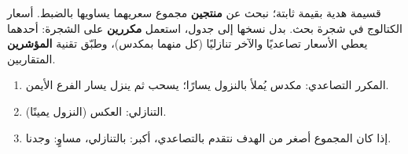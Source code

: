 \begin{statement}
قسيمة هدية بقيمة ثابتة؛ نبحث عن \textbf{منتجين} مجموع سعريهما يساويها بالضبط. أسعار الكتالوج في شجرة بحث. بدل نسخها إلى جدول، استعمل \textbf{مكررين} على الشجرة: أحدهما يعطي الأسعار تصاعديًا والآخر تنازليًا (كل منهما بمكدس)، وطبّق تقنية \textbf{المؤشرين} المتقاربين.
\end{statement}
\begin{stepsbox}\begin{enumerate}
\item المكرر التصاعدي: مكدس يُملأ بالنزول يسارًا؛  يسحب ثم ينزل يسار الفرع الأيمن.
\item التنازلي: العكس (النزول يمينًا).
\item إذا كان المجموع أصغر من الهدف نتقدم بالتصاعدي، أكبر: بالتنازلي، مساوٍ: وجدنا.
\end{enumerate}\end{stepsbox}
